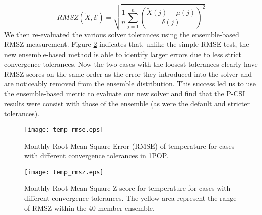 $$ RMSZ(\tilde{X}, \mathcal{E}) =  \sqrt{\frac{1}{n}\sum_{j=1}^n(\frac{\tilde{X}(j) -\mu (j)}{\delta (j)})^2}$$
We then re-evaluated the various solver tolerances using the ensemble-based RMSZ measurement.
Figure \ref{fig:ssh_rmsz_t} indicates that, unlike the simple RMSE test, the new ensemble-based method
is able to identify larger errors due to less strict convergence tolerances.  Now
the two cases with the loosest tolerances clearly have RMSZ scores on the same order as the error
they introduced into the solver and are noticeably removed from the ensemble distribution.
This success led us to use the ensemble-based metric to evaluate our new solver and find that the P-CSI results were consist with those of the ensemble (as were the default and stricter tolerances).

\begin{figure}[!t]
\begin{center}
\texttt{[image: temp\_rmse.eps]}
\end{center}
\vspace{-.1in}
\caption[] {Monthly Root Mean Square Error (RMSE) of temperature for cases with different convergence tolerances in 1\degree\space POP.}
\label{fig:ssh_rmse_t}
\vspace{-.1in}
\end{figure}
\begin{figure}[!t]
\begin{center}
\texttt{[image: temp\_rmsz.eps]}
\end{center}
\vspace{-.1in}
\caption[] {Monthly Root Mean Square Z-score for temperature for cases with different convergence tolerances. The yellow area represent the range of RMSZ within the 40-member ensemble.}
\vspace{-.1in}
\label{fig:ssh_rmsz_t}
\end{figure}


